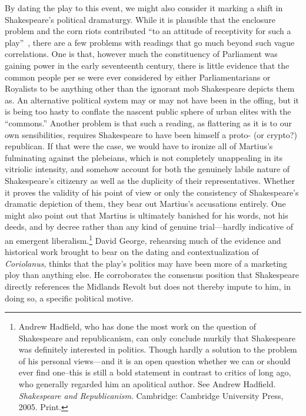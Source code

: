 By dating the play to this event, we might also consider it marking a shift in Shakespeare's political dramaturgy.
While it is plausible that the enclosure problem and the corn riots contributed ``to an attitude of receptivity for such a play''~\cite[127]{stirling_populace_1949}, there are a few problems with readings that go much beyond such vague correlations.
One is that, however much the constituency of Parliament was gaining power in the early seventeenth century, there is little evidence that the common people per se were ever considered by either Parliamentarians or Royalists to be anything other than the ignorant mob Shakespeare depicts them as.
An alternative political system may or may not have been in the offing, but it is being too hasty to conflate the nascent public sphere of urban elites with the ``commons.''
Another problem is that such a reading, as flattering as it is to our own sensibilities, requires Shakespeare to have been himself a proto- (or crypto?) republican.
If that were the case, we would have to ironize all of Martius's fulminating against the plebeians, which is not completely unappealing in its vitriolic intensity, and somehow account for both the genuinely labile nature of Shakespeare's citizenry as well as the duplicity of their representatives.
Whether it proves the validity of his point of view or only the consistency of Shakespeare's dramatic depiction of them, they bear out Martius's accusations entirely.
One might also point out that Martius is ultimately banished for his words, not his deeds, and by decree rather than any kind of genuine trial---hardly indicative of an emergent liberalism.\footnote{Andrew Hadfield, who has done the most work on the question of Shakespeare and republicanism, can only conclude murkily that Shakespeare was definitely interested in politics.
Though hardly a solution to the problem of his personal views---and it is an open question whether we can or should ever find one--this is still a bold statement in contrast to critics of long ago, who generally regarded him an apolitical author. See Andrew Hadfield. \emph{Shakespeare and Republicanism}. Cambridge: Cambridge University Press, 2005. Print.}
David George, rehearsing much of the evidence and historical work brought to bear on the dating and contextualization of \emph{Coriolanus}, thinks that the play's politics may have been more of a marketing ploy than anything else.
He corroborates the consensus position that Shakespeare directly references the Midlands Revolt but does not thereby impute to him, in doing so, a specific political motive.
